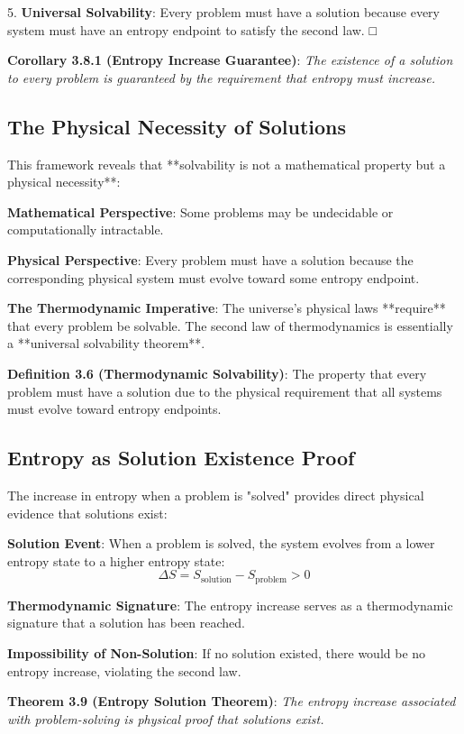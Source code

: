 \documentclass[12pt,a4paper]{article}
\theoremstyle{definition}
\begin{document}
5. \textbf{Universal Solvability}: Every problem must have a solution because every system must have an entropy endpoint to satisfy the second law. □

\textbf{Corollary 3.8.1 (Entropy Increase Guarantee)}: \textit{The existence of a solution to every problem is guaranteed by the requirement that entropy must increase.}

\subsection{The Physical Necessity of Solutions}

This framework reveals that **solvability is not a mathematical property but a physical necessity**:

\textbf{Mathematical Perspective}: Some problems may be undecidable or computationally intractable.

\textbf{Physical Perspective}: Every problem must have a solution because the corresponding physical system must evolve toward some entropy endpoint.

\textbf{The Thermodynamic Imperative}: The universe's physical laws **require** that every problem be solvable. The second law of thermodynamics is essentially a **universal solvability theorem**.

\textbf{Definition 3.6 (Thermodynamic Solvability)}: The property that every problem must have a solution due to the physical requirement that all systems must evolve toward entropy endpoints.

\subsection{Entropy as Solution Existence Proof}

The increase in entropy when a problem is "solved" provides direct physical evidence that solutions exist:

\textbf{Solution Event}: When a problem is solved, the system evolves from a lower entropy state to a higher entropy state:
$$\Delta S = S_{\text{solution}} - S_{\text{problem}} > 0$$

\textbf{Thermodynamic Signature}: The entropy increase serves as a thermodynamic signature that a solution has been reached.

\textbf{Impossibility of Non-Solution}: If no solution existed, there would be no entropy increase, violating the second law.

\textbf{Theorem 3.9 (Entropy Solution Theorem)}: \textit{The entropy increase associated with problem-solving is physical proof that solutions exist.}
\end{document}
